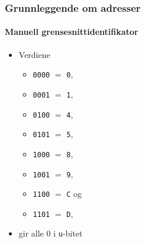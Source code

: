 \begin{frame}%
  \frametitle{Grunnleggende om adresser}
  \framesubtitle{Manuell grensesnittidentifikator}
  \begin{itemize}[<+->]
  \item Verdiene
    \begin{itemize}[<+->]
    \item \texttt{00\alert{0}0} \(=\) \texttt{0},
    \item \texttt{00\alert{0}1} \(=\) \texttt{1},
    \item \texttt{01\alert{0}0} \(=\) \texttt{4},
    \item \texttt{01\alert{0}1} \(=\) \texttt{5},
    \item \texttt{10\alert{0}0} \(=\) \texttt{8},
    \item \texttt{10\alert{0}1} \(=\) \texttt{9},
    \item \texttt{11\alert{0}0} \(=\) \texttt{C} og
    \item \texttt{11\alert{0}1} \(=\) \texttt{D},
    \end{itemize}
  \item gir alle \(0\) i \texttt{u}-bitet
  \end{itemize}
\end{frame}

